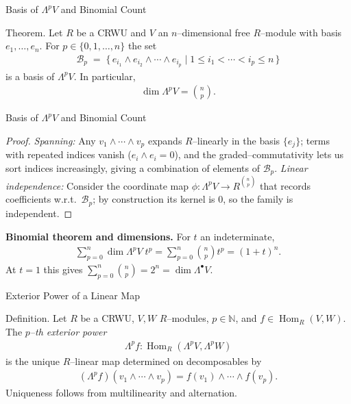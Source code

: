 
\begin{frame}{Basis of $\Lambda^{p}V$ and Binomial Count}
\begin{block}{Theorem.}
Let $R$ be a CRWU and $V$ an $n$–dimensional free $R$–module with basis $e_1,\dots,e_n$. For $p\in\{0,1,\dots,n\}$ the set
\begin{align*}
\mathcal{B}_{p}\;=\;\{\, e_{i_1}\wedge e_{i_2}\wedge\cdots\wedge e_{i_p}\mid 1\le i_1<\cdots<i_p\le n \,\}
\end{align*}
is a basis of $\Lambda^{p}V$. In particular,
\begin{align*}
\dim\Lambda^{p}V=\binom{n}{p}.
\end{align*}
\end{block}

\end{frame}

\begin{frame}{Basis of $\Lambda^{p}V$ and Binomial Count}
\begin{proof}
\emph{Spanning:} Any $v_1\wedge\cdots\wedge v_p$ expands $R$–linearly in the basis $\{e_j\}$; terms with repeated indices vanish ($e_i\wedge e_i=0$), and the graded–commutativity lets us sort indices increasingly, giving a combination of elements of $\mathcal{B}_p$.
\emph{Linear independence:} Consider the coordinate map $\phi:\Lambda^pV\!\to\! R^{\binom{n}{p}}$ that records coefficients w.r.t.\ $\mathcal{B}_p$; by construction its kernel is $0$, so the family is independent.
\end{proof}

\textbf{Binomial theorem and dimensions.}
For $t$ an indeterminate,
\begin{align*}
\sum_{p=0}^{n}\dim\Lambda^{p}V\; t^{p}
=\sum_{p=0}^{n}\binom{n}{p}t^{p}=(1+t)^{n}.
\end{align*}
At $t=1$ this gives $\sum_{p=0}^n\binom{n}{p}=2^n=\dim\Lambda^{\bullet}V$.
\end{frame}

\begin{frame}{Exterior Power of a Linear Map}
\begin{block}{Definition.}
Let $R$ be a CRWU, $V,W$ $R$–modules, $p\in\mathbb{N}$, and $f\in \operatorname{Hom}_R(V,W)$. The \emph{$p$–th exterior power}
\begin{align*}
\Lambda^{p}f:\operatorname{Hom}_{R}\left(\Lambda^{p}V, \Lambda^{p}W\right)
\end{align*}
is the unique $R$–linear map determined on decomposables by
\begin{align*}
(\Lambda^{p}f)(v_1\wedge\cdots\wedge v_p)=f(v_1)\wedge\cdots\wedge f(v_p).
\end{align*}
Uniqueness follows from multi\-linearity and alternation.
\end{block}
\end{frame}

